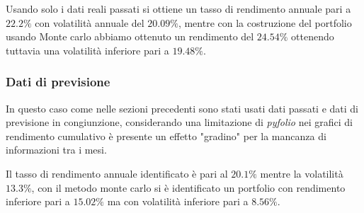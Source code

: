Usando solo i dati reali passati si ottiene un tasso di rendimento annuale pari a $22.2\%$ con volatilità annuale del $20.09\%$, mentre con la costruzione
del portfolio usando Monte carlo abbiamo ottenuto un rendimento del $24.54\%$ ottenendo tuttavia una volatilità inferiore pari a $19.48\%$.

\subsubsection{Dati di previsione}

In questo caso come nelle sezioni precedenti sono stati usati dati passati e dati di previsione in congiunzione, considerando una limitazione di \emph{pyfolio} nei grafici di rendimento
cumulativo è presente un effetto "gradino" per la mancanza di informazioni tra i mesi.

Il tasso di rendimento annuale identificato è pari al $20.1\%$ mentre la volatilità $13.3\%$, con il metodo monte carlo si è identificato un portfolio con rendimento inferiore pari a $15.02\%$ ma con
volatilità inferiore pari a $8.56\%$.